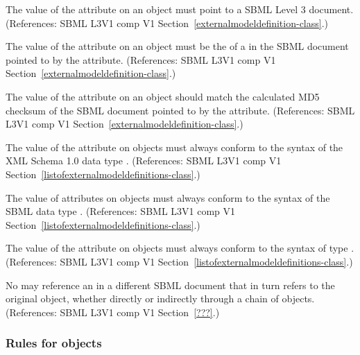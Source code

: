 \begin{sbmlenum}
 { The value of the  attribute on an
  \ExternalModelDefinition object must point to a SBML Level 3 document.
  (References: SBML L3V1 comp V1 Section~\ref{externalmodeldefinition-class}.) }


 { The value of the  attribute on an
  \ExternalModelDefinition object must be the  of a \Model
  in the SBML document pointed to by the  attribute.
  (References: SBML L3V1 comp V1 Section~\ref{externalmodeldefinition-class}.) }


 { The value of the  attribute on an
  \ExternalModelDefinition object should match the
  calculated MD5 checksum of the SBML document pointed to by the 
   attribute.
  (References: SBML L3V1 comp V1 Section~\ref{externalmodeldefinition-class}.) }


 { The value of the  attribute on
  \ExternalModelDefinition objects must always conform to the syntax of
  the XML Schema 1.0 data type .
  (References: SBML L3V1 comp V1 
  Section~\ref{listofexternalmodeldefinitions-class}.) }


 { The value of  attributes on
  \ExternalModelDefinition objects must always conform to the syntax of
  the SBML data type .
  (References: SBML L3V1 comp V1 
  Section~\ref{listofexternalmodeldefinitions-class}.) }


 { The value of the  attribute on
  \ExternalModelDefinition objects must always conform to the syntax of
  type .
  (References: SBML L3V1 comp V1 
  Section~\ref{listofexternalmodeldefinitions-class}.) }

 { No \ExternalModelDefinition may reference an
  \ExternalModelDefinition in a different SBML document that in turn
  refers to the original \ExternalModelDefinition object, whether
  directly or indirectly through a chain of \ExternalModelDefinition
  objects.
  (References: SBML L3V1 comp V1 Section~\ref{???}.) }

\end{sbmlenum} \subsubsection*{Rules for  objects} \begin{sbmlenum}


\end{sbmlenum}
